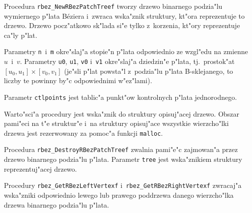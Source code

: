 \vspace{\bigskipamount}
Procedura \texttt{rbez\_NewRBezPatchTreef} tworzy drzewo binarnego podzia"lu
wymiernego p"lata B\'{e}ziera i~zwraca wska"znik struktury, kt"ora
reprezentuje to drzewo. Drzewo pocz"atkowo sk"lada si"e tylko z~korzenia,
kt"ory reprezentuje ca"ly p"lat.

Parametry \texttt{n}~i~\texttt{m} okre"slaj"a stopie"n p"lata odpowiednio ze
wzgl"edu na zmienne $u$~i~$v$. Parametry \texttt{u0}, \texttt{u1},
\texttt{v0} i~\texttt{v1} okre"slaj"a dziedzin"e p"lata, tj.~prostok"at
$[u_0,u_1]\times[v_0,v_1]$ (je"sli p"lat powsta"l z~podzia"lu p"lata
B-sklejanego, to liczby te powinny by"c odpowiednimi w"ez"lami).

Parametr \texttt{ctlpoints} jest tablic"a punkt"ow kontrolnych p"lata
jednorodnego.

Warto"sci"a procedury jest wska"znik do struktury opisuj"acej drzewo.
Obszar pami"eci na t"e struktur"e i~na struktury opisuj"ace wszystkie
wierzcho"lki drzewa jest rezerwowany za pomoc"a funkcji \texttt{malloc}.

\vspace{\bigskipamount}
\begin{sloppypar}
Procedura \texttt{rbez\_DestroyRBezPatchTreef} zwalnia pami"e"c zajmowan"a przez
drze\-wo binarnego podzia"lu p"lata. Parametr \texttt{tree} jest wska"znikiem
struktury reprezentuj"acej drzewo.%
\end{sloppypar}

\vspace{\bigskipamount}
Procedury \texttt{rbez\_GetRBezLeftVertexf} i~\texttt{rbez\_GetRBezRightVertexf}
zwracaj"a wska"zniki odpowiednio lewego lub prawego poddrzewa danego
wierzcho"lka drzewa binarnego podzia"lu p"lata.

